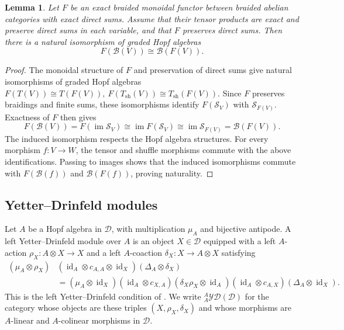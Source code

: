 \documentclass[11pt, a4paper]{article}
\numberwithin{equation}{section}
\newcommand{\D}{\mathcal D}
\newcommand{\B}{\mathcal B}
\newcommand{\YD}{\mathcal{YD}}
\DeclareMathOperator{\id}{id}
\DeclareMathOperator{\im}{im}
\newtheorem{lemma}[theorem]{Lemma}
\begin{document}
\begin{lemma}\label{pre:nichols-functoriality}
Let $F$ be an exact braided monoidal functor between braided
abelian categories with exact direct sums.
Assume that their tensor products are exact and preserve
direct sums in each variable, and that $F$ preserves direct sums.
Then there is a natural isomorphism of graded Hopf algebras
\[
 F(\B(V))\cong\B(F(V)).
\]
\end{lemma}

\begin{proof}
The monoidal structure of $F$ and preservation of direct sums
give natural isomorphisms of graded Hopf algebras
$
 F(T(V))\cong T(F(V)),
 \
 F(T_{\mathrm{sh}}(V))\cong T_{\mathrm{sh}}(F(V)).
$
Since $F$ preserves braidings and finite sums, these
isomorphisms identify $F(\mathcal S_V)$ with
$\mathcal S_{F(V)}$.
Exactness of $F$ then gives
\[
 F(\B(V))
 =F(\im\mathcal S_V)
 \cong\im F(\mathcal S_V)
 \cong\im\mathcal S_{F(V)}
 =\B(F(V)).
\]
The induced isomorphism respects the Hopf algebra structures.
For every morphism $f:V\to W$, the tensor and shuffle
morphisms commute with the above identifications.
Passing to images shows that the induced isomorphisms commute
with $F(\B(f))$ and $\B(F(f))$, proving naturality.
\end{proof}

\subsection{Yetter--Drinfeld modules}\label{pre:yet-drinfeld}


Let $A$ be a Hopf algebra in $\D$, with multiplication $\mu_A$
and bijective antipode.
A left Yetter--Drinfeld module over $A$ is an object $X\in\D$
equipped with a left $A$-action $\rho_X:A\otimes X\longrightarrow X$ and a left $A$-coaction $\delta_X:X\longrightarrow A\otimes X$
satisfying
\begin{equation}\label{pre:yd-condition}
\begin{aligned}
 (\mu_A\otimes\rho_X)
  & (\id_A\otimes c_{A,A}\otimes\id_X)
   (\Delta_A\otimes\delta_X)\\
 &=
   (\mu_A\otimes\id_X)
   (\id_A\otimes c_{X,A})
   (\delta_X\rho_X\otimes\id_A)
   (\id_A\otimes c_{A,X})
   (\Delta_A\otimes\id_X).
\end{aligned}
\end{equation}
This is the left Yetter--Drinfeld condition of
\cite[Definition~3.4.1]{rootsys}.
We write ${}_A^A\YD(\D)$ for the category whose objects are
these triples $(X,\rho_X,\delta_X)$ and whose morphisms are
$A$-linear and $A$-colinear morphisms in $\D$.
\end{document}
